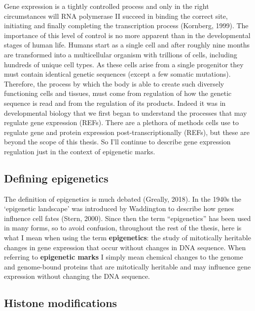 \documentclass[11pt,twoside]{bristolthesis}
\begin{document}
Gene expression is a tightly controlled process and only in the right circumstances will RNA polymerase II succeed in binding the correct site, initiating and finally completing the transcription process (Kornberg, 1999). The importance of this level of control is no more apparent than in the developmental stages of human life. Humans start as a single cell and after roughly nine months are transformed into a multicellular organism with trillions of cells, including hundreds of unique cell types. As these cells arise from a single progenitor they must contain identical genetic sequences (except a few somatic mutations). Therefore, the process by which the body is able to create such diversely functioning cells and tissues, must come from regulation of how the genetic sequence is read and from the regulation of its products. Indeed it was in developmental biology that we first began to understand the processes that may regulate gene expression (REFs). There are a plethora of methods cells use to regulate gene and protein expression post-transcriptionally (REFs), but these are beyond the scope of this thesis. So I'll continue to describe gene expression regulation just in the context of epigenetic marks.

\hypertarget{defining-epigenetics}{%
\subsection{Defining epigenetics}\label{defining-epigenetics}}

The definition of epigenetics is much debated (Greally, 2018). In the 1940s the `epigenetic landscape' was introduced by Waddington to describe how genes influence cell fates (Stern, 2000). Since then the term ``epigenetics'' has been used in many forms, so to avoid confusion, throughout the rest of the thesis, here is what I mean when using the term \textbf{epigenetics}: the study of mitotically heritable changes in gene expression that occur without changes in DNA sequence. When referring to \textbf{epigenetic marks} I simply mean chemical changes to the genome and genome-bound proteins that are mitotically heritable and may influence gene expression without changing the DNA sequence.

\hypertarget{histone-modifications}{%
\subsection{Histone modifications}\label{histone-modifications}}
\end{document}
